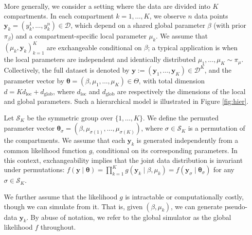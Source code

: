 \documentclass[11pt,a4paper]{article}
\def\dataspace{\mathcal{D}}
\def\dglob{d_{\mathrm{\scriptscriptstyle glob}}}
\def\dloc{d_{\mathrm{\scriptscriptstyle loc}}}
\def\globparam{\beta}
\def\locparam{\mu}
\def\obsdata{\mathbf{y}}
\def\obsdataUn{y}
\def\param{\boldsymbol{\theta}}
\def\parset{\Theta}
\def\rr#1{\textcolor{teal}{\textit{// RR: #1}}}
\theoremstyle{plain}
\theoremstyle{definition}
\theoremstyle{remark}
\begin{document}
More generally, we consider a setting where the data are divided into $K$ compartments. In each compartment $k = 1, \dots, K$, we observe $n$ data points $\obsdata_k = (\obsdataUn_k^1, \dots, \obsdataUn_k^n) \in \dataspace$, which depend on a shared global parameter $\globparam$ (with prior $\pi_\globparam$) and a compartment-specific local parameter $\locparam_k$. We assume that $(\mu_k, \obsdata_k)_{k=1}^K$ are exchangeable conditional on $\globparam$; a typical application is when the local parameters are independent and identically distributed $\mu_1,\ldots,\mu_K\sim\pi_\mu$. Collectively, the full dataset is denoted by $\obsdata := (\obsdata_1, \dots, \obsdata_K) \in \dataspace^K$, and the parameter vector by $\param = (\globparam, \locparam_{1}, \dots, \locparam_{K}) \in \parset$, with total dimension $d = K\dloc + \dglob$, where $\dloc$ and $\dglob$ are respectively the dimensions of the local and global parameters. 
Such a hierarchical model is illustrated in Figure \ref{fig:hier}.

Let $\mathcal S_K$ be the symmetric group over $\{1,\ldots,K\}$. 
We define the permuted parameter vector $\param_{\sigma} = (\globparam, \locparam_{\sigma(1)}, \dots, \locparam_{\sigma(K)})$, where $\sigma \in \mathcal{S}_K$ is a permutation of the compartments. We assume that each $\obsdata_k$ is generated independently from a common likelihood function $g$, conditional on its corresponding parameters. In this context, exchangeability implies that the joint data distribution is invariant under permutations: $f(\obsdata\mid \param) = \prod_{k = 1}^K g(\obsdata_k\mid \globparam,\locparam_k) = f(\obsdata_{\sigma} \mid \param_{\sigma})$ for any $\sigma \in \mathcal{S}_K$. 

We further assume that the likelihood $g$ is intractable or computationally costly, though we can simulate from it. That is, given $(\globparam,\locparam_k)$, we can generate pseudo-data $\obsdata_k$. By abuse of notation, we refer to the global simulator as the global likelihood $f$ throughout.

\end{document}
